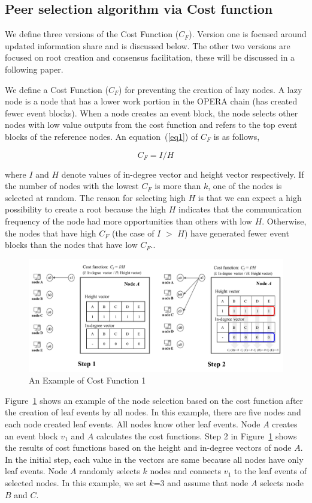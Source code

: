 \documentclass{article}
\begin{document}
\subsection{Peer selection algorithm via Cost function}
We define three versions of the Cost Function ($C_F$). Version one is focused around updated information share and is discussed below. The other two versions are focused on root creation and consensus facilitation, these will be discussed in a following paper.


We define a Cost Function ($C_F$) for preventing the creation of lazy nodes. A lazy node is a node that has a lower work portion in the OPERA chain (has created fewer event blocks). When a node creates an event block, the node selects other nodes with low value outputs from the cost function and refers to the top event blocks of the reference nodes. An equation~(\ref{eq1}) of $C_F$ is as follows,

\begin{equation}\label{eq1}
C_{F} =I/H
\end{equation}

where $I$ and $H$ denote values of in-degree vector and height vector respectively. If the number of nodes with the lowest $C_F$ is more than $k$, one of the nodes is selected at random. The reason for selecting high $H$ is that we can expect a high possibility to create a root because the high $H$ indicates that the communication frequency of the node had more opportunities than others with low $H$. Otherwise, the nodes that have high $C_F$ (the case of $I$ $>$ $H$) have generated fewer event blocks than the nodes that have low $C_F$.. 

\begin{figure} \centering  
\includegraphics[width=.8\textwidth]{costfunction_1.pdf}
\caption{An Example of Cost Function 1}
\label{fig:costfunction_1}
\end{figure}
\newpage
Figure~\ref{fig:costfunction_1} shows an example of the node selection based on the cost function after the creation of leaf events by all nodes. In this example, there are five nodes and each node created leaf events. All nodes know other leaf events. Node $A$ creates an event block $v_1$ and $A$ calculates the cost functions. Step 2 in Figure~\ref{fig:costfunction_1} shows the results of cost functions based on the height and in-degree vectors of node $A$. In the initial step, each value in the vectors are same because all nodes have only leaf events. Node $A$ randomly selects $k$ nodes and connects $v_1$ to the leaf events of selected nodes. In this example, we set $k$=3 and assume that node $A$ selects node $B$ and $C$. 
\end{document}
